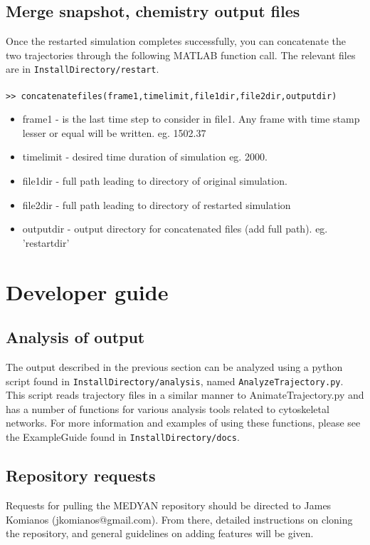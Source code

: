 \documentclass[11pt, oneside]{article}   	%
\begin{document}
\subsection{Merge snapshot, chemistry output files}
Once the restarted simulation completes successfully, you can concatenate the two trajectories through the following MATLAB function call. The relevant files are in \texttt{InstallDirectory/restart}.  \\ \\
\indent \texttt{>> concatenatefiles(frame1,time\textunderscore limit,file1dir,file2dir,outputdir)}\\
\begin{itemize}
\item frame1 - is the last time step to consider in file1. Any frame with time stamp lesser or equal will be written. eg. 1502.37
\item time\textunderscore limit - desired time duration of simulation eg. 2000.
\item file1dir - full path leading to directory of original simulation.
\item file2dir - full path leading to directory of restarted simulation
\item outputdir - output directory for concatenated files (add full path). eg. 'restartdir'
\end{itemize}
\section{Developer guide}

\subsection{Analysis of output}

The output described in the previous section can be analyzed using a python script found in \texttt{InstallDirectory/analysis}, named \texttt{AnalyzeTrajectory.py}. This script reads trajectory files in a similar manner to AnimateTrajectory.py and has a number of functions for various analysis tools related to cytoskeletal networks. For more information and examples of using these functions, please see the ExampleGuide found in \texttt{InstallDirectory/docs}.

\subsection{Repository requests}

Requests for pulling the MEDYAN repository should be directed to James Komianos (jkomianos@gmail.com). From there, detailed instructions on cloning the repository, and general guidelines on adding features will be given.
\end{document}
